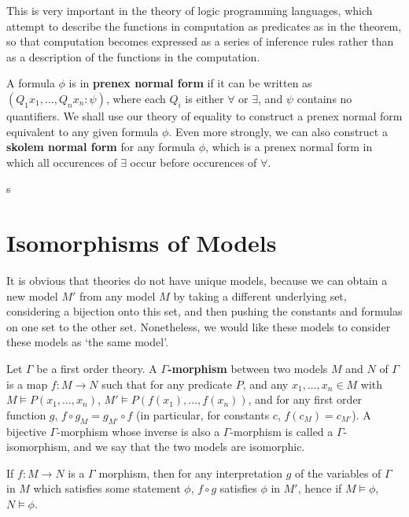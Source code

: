 This is very important in the theory of logic programming languages, which attempt to describe the functions in computation as predicates as in the theorem, so that computation becomes expressed as a series of inference rules rather than as a description of the functions in the computation.

A formula $\phi$ is in {\bf prenex normal form} if it can be written as $(Q_1 x_1, \dots, Q_n x_n : \psi)$, where each $Q_i$ is either $\forall$ or $\exists$, and $\psi$ contains no quantifiers. We shall use our theory of equality to construct a prenex normal form equivalent to any given formula $\phi$. Even more strongly, we can also construct a {\bf skolem normal form} for any formula $\phi$, which is a prenex normal form in which all occurences of $\exists$ occur before occurences of $\forall$.

\begin{theorem}
    s
\end{theorem}

\section{Isomorphisms of Models}

It is obvious that theories do not have unique models, because we can obtain a new model $M'$ from any model $M$ by taking a different underlying set, considering a bijection onto this set, and then pushing the constants and formulas on one set to the other set. Nonetheless, we would like these models to consider these models as `the same model'.

Let $\Gamma$ be a first order theory. A {\bf $\Gamma$-morphism} between two models $M$ and $N$ of $\Gamma$ is a map $f: M \to N$ such that for any predicate $P$, and any $x_1, \dots, x_n \in M$ with $M \vDash P(x_1,\dots,x_n)$, $M' \vDash P(f(x_1), \dots, f(x_n))$, and for any first order function $g$, $f \circ g_M = g_{M'} \circ f$ (in particular, for constants $c$, $f(c_M) = c_{M'}$). A bijective $\Gamma$-morphism whose inverse is also a $\Gamma$-morphism is called a $\Gamma$-isomorphism, and we say that the two models are isomorphic.

\begin{theorem}
    If $f: M \to N$ is a $\Gamma$ morphism, then for any interpretation $g$ of the variables of $\Gamma$ in $M$ which satisfies some statement $\phi$, $f \circ g$ satisfies $\phi$ in $M'$, hence if $M \vDash \phi$, $N \vDash \phi$.
\end{theorem}

